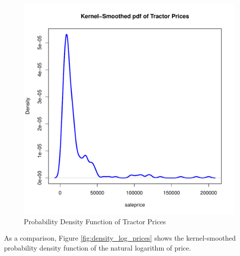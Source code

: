 \begin{figure}[h!]
  \centering
  \includegraphics[scale = 0.5, keepaspectratio=true]{../Figures/density_prices}
  \caption{Probability Density Function of Tractor Prices} \label{fig:density_prices}
\end{figure}



\pagebreak
As a comparison, Figure \ref{fig:density_log_prices} shows the kernel-smoothed probability density function of the natural logarithm of
price.

